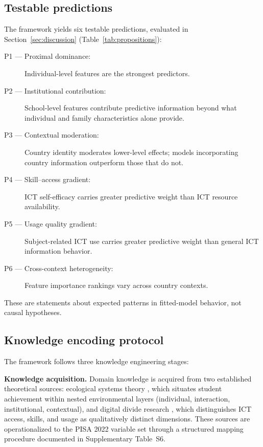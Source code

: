 \documentclass[review,12pt]{elsarticle}
\begin{document}
\subsection{Testable predictions}

The framework yields six testable predictions, evaluated in Section~\ref{sec:discussion} (Table~\ref{tab:propositions}):

\begin{description}
\item[P1 --- Proximal dominance:] Individual-level features are the strongest predictors.
\item[P2 --- Institutional contribution:] School-level features contribute predictive information beyond what individual and family characteristics alone provide.
\item[P3 --- Contextual moderation:] Country identity moderates lower-level effects; models incorporating country information outperform those that do not.
\item[P4 --- Skill--access gradient:] ICT self-efficacy carries greater predictive weight than ICT resource availability.
\item[P5 --- Usage quality gradient:] Subject-related ICT use carries greater predictive weight than general ICT information behavior.
\item[P6 --- Cross-context heterogeneity:] Feature importance rankings vary across country contexts.
\end{description}

These are statements about expected patterns in fitted-model behavior, not causal hypotheses.

\subsection{Knowledge encoding protocol}

The framework follows three knowledge engineering stages:

\textbf{Knowledge acquisition.} Domain knowledge is acquired from two established theoretical sources: ecological systems theory \citep{Bronfenbrenner_1979,Bronfenbrenner_1994}, which situates student achievement within nested environmental layers (individual, interaction, institutional, contextual), and digital divide research \citep{van_Dijk_2005,van_Dijk_2020}, which distinguishes ICT access, skills, and usage as qualitatively distinct dimensions. These sources are operationalized to the PISA 2022 variable set through a structured mapping procedure documented in Supplementary Table~S6.
\end{document}
